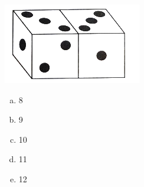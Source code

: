 \documentclass[a4paper,14pt]{article}
\begin{document}
\begin{multicols}{2}
    \includegraphics[width=1\linewidth]{imagens_6FMA50/imagem3}
    
    \begin{enumerate}[a)]
    	\item 8
    	\item 9
    	\item 10
    	\item 11
    	\item 12
    \end{enumerate}
    $~$ \\ $~$ \\ $~$
    \end{multicols}
\end{document}
